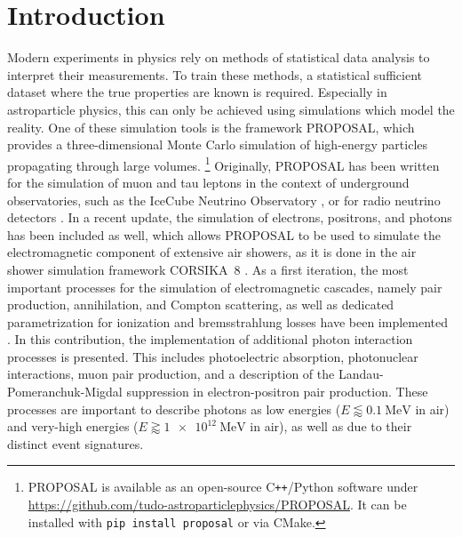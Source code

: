 \section{Introduction}

Modern experiments in physics rely on methods of statistical data analysis to interpret their measurements.
To train these methods, a statistical sufficient dataset where the true properties are known is required.
Especially in astroparticle physics, this can only be achieved using simulations which model the reality.
One of these simulation tools is the framework PROPOSAL, which provides a three-dimensional Monte Carlo simulation of high-energy particles propagating through large volumes. \footnote{PROPOSAL is available as an open-source C\texttt{++}/Python software under \url{https://github.com/tudo-astroparticlephysics/PROPOSAL}. It can be installed with \texttt{pip install proposal} or via CMake.}
Originally, PROPOSAL has been written for the simulation of muon and tau leptons in the context of underground observatories, such as the IceCube Neutrino Observatory \cite{IceCube:2021uhz}, or for radio neutrino detectors \cite{PhysRevD.102.083011}.
In a recent update, the simulation of electrons, positrons, and photons has been included as well, which allows PROPOSAL to be used to simulate the electromagnetic component of extensive air showers, as it is done in the air shower simulation framework CORSIKA~8 \cite{icrc2023}. 
As a first iteration, the most important processes for the simulation of electromagnetic cascades, namely pair production, annihilation, and Compton scattering, as well as dedicated parametrization for ionization and bremsstrahlung losses have been implemented \cite{Alameddine:2021iq}.
In this contribution, the implementation of additional photon interaction processes is presented.
This includes photoelectric absorption, photonuclear interactions, muon pair production, and a description of the Landau-Pomeranchuk-Migdal suppression in electron-positron pair production.
These processes are important to describe photons as low energies ($E \lessapprox \SI{0.1}{\mega\electronvolt}$ in air) and very-high energies ($E \gtrapprox \SI{1e12}{\mega\electronvolt}$ in air), as well as due to their distinct event signatures.